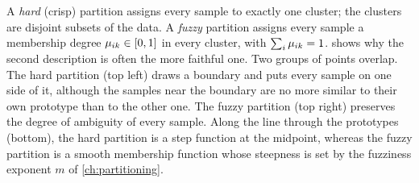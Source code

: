 A \emph{hard} (crisp) partition assigns every sample to exactly one cluster; the clusters are disjoint subsets of the data. A \emph{fuzzy} partition \cite{zadeh:1965:fuzzysets,ruspini:1969} assigns every sample a membership degree $\mu_{ik}\in[0,1]$ in every cluster, with $\sum_i\mu_{ik}=1$.  shows why the second description is often the more faithful one. Two groups of points overlap. The hard partition (top left) draws a boundary and puts every sample on one side of it, although the samples near the boundary are no more similar to their own prototype than to the other one. The fuzzy partition (top right) preserves the degree of ambiguity of every sample. Along the line through the prototypes (bottom), the hard partition is a step function at the midpoint, whereas the fuzzy partition is a smooth membership function whose steepness is set by the fuzziness exponent $m$ of \cref{ch:partitioning}.

